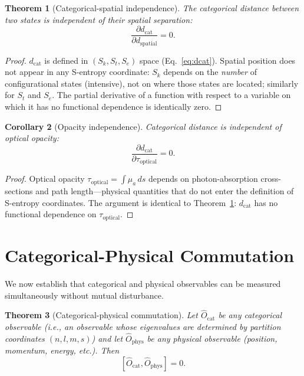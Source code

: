 \documentclass[10pt,twocolumn]{article}
\newtheorem{theorem}{Theorem}[section]
\newtheorem{corollary}[theorem]{Corollary}
\theoremstyle{definition}
\theoremstyle{remark}
\newcommand{\Ocat}{\hat{O}_{\mathrm{cat}}}
\newcommand{\Ophys}{\hat{O}_{\mathrm{phys}}}
\newcommand{\dcat}{d_{\mathrm{cat}}}
\newcommand{\dspatial}{d_{\mathrm{spatial}}}
\newcommand{\topt}{\tau_{\mathrm{optical}}}
\newcommand{\Sk}{S_k}
\newcommand{\St}{S_t}
\newcommand{\Se}{S_e}
\begin{document}
\begin{theorem}[Categorical-spatial independence]
\label{thm:catspace}
The categorical distance between two states is independent of
their spatial separation:
\begin{equation}\label{eq:catspace}
  \frac{\partial\dcat}{\partial\dspatial} = 0.
\end{equation}
\end{theorem}

\begin{proof}
$\dcat$ is defined in $(\Sk,\St,\Se)$ space
(Eq.~\ref{eq:dcat}).  Spatial position does not appear in any
S-entropy coordinate: $\Sk$ depends on the \emph{number} of
configurational states (intensive), not on where those states
are located; similarly for $\St$ and $\Se$.  The partial
derivative of a function with respect to a variable on which it
has no functional dependence is identically zero.
\end{proof}

\begin{corollary}[Opacity independence]\label{cor:opacity}
Categorical distance is independent of optical opacity:
\begin{equation}\label{eq:opacity_indep}
  \frac{\partial\dcat}{\partial\topt} = 0.
\end{equation}
\end{corollary}

\begin{proof}
Optical opacity $\topt = \int\mu_a\,ds$ depends on
photon-absorption cross-sections and path length---physical
quantities that do not enter the definition of S-entropy
coordinates.  The argument is identical to
Theorem~\ref{thm:catspace}: $\dcat$ has no functional
dependence on $\topt$.
\end{proof}

\section{Categorical-Physical Commutation}
\label{sec:commutation}

We now establish that categorical and physical observables can
be measured simultaneously without mutual disturbance.

\begin{theorem}[Categorical-physical commutation]
\label{thm:commute}
Let $\Ocat$ be any categorical observable (i.e., an observable
whose eigenvalues are determined by partition coordinates
$(n,l,m,s)$) and let $\Ophys$ be any physical observable
(position, momentum, energy, etc.).  Then
\begin{equation}\label{eq:commute}
  [\Ocat,\Ophys] = 0.
\end{equation}
\end{theorem}
\end{document}
